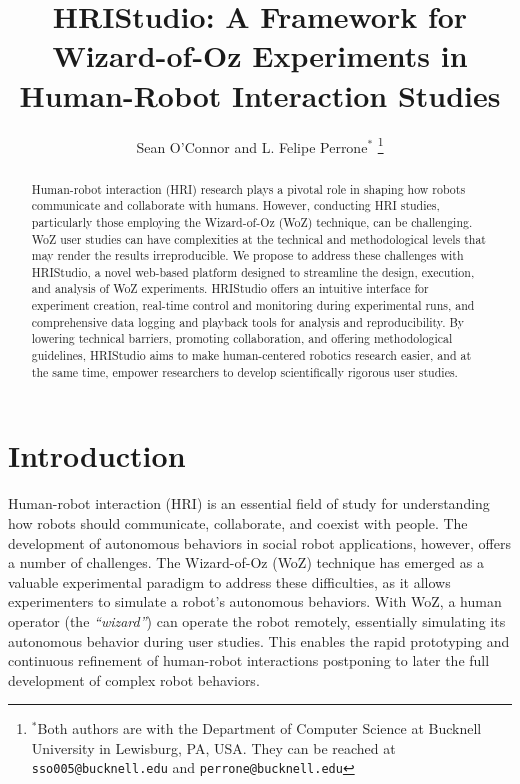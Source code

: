\documentclass[letterpaper, 10 pt, conference]{ieeeconf}
\title{\LARGE \bf HRIStudio: A Framework for Wizard-of-Oz Experiments in Human-Robot Interaction Studies}
\author{Sean O'Connor and L. Felipe Perrone$^{*}$
    \thanks{$^{*}$Both authors are with the Department of Computer Science at
        Bucknell University in Lewisburg, PA, USA. They can be reached at {\tt\small sso005@bucknell.edu} and {\tt\small perrone@bucknell.edu}}%
}
\begin{document}
\maketitle
\thispagestyle{empty}
\pagestyle{empty}


\begin{abstract}

Human-robot interaction (HRI) research plays a pivotal role in shaping how robots communicate and collaborate with humans. However, conducting HRI studies, particularly those employing the Wizard-of-Oz (WoZ) technique, can be challenging. WoZ user studies can have complexities at the technical and methodological levels that may render the results irreproducible. We propose to address these challenges with HRIStudio, a novel web-based platform designed to streamline the design, execution, and analysis of WoZ experiments. HRIStudio offers an intuitive interface for experiment creation, real-time control and monitoring during experimental runs, and comprehensive data logging and playback tools for analysis and reproducibility. By lowering technical barriers, promoting collaboration, and offering methodological guidelines, HRIStudio aims to make human-centered robotics research easier, and at the same time, empower researchers to develop scientifically rigorous user studies.

\end{abstract}




\section{Introduction}

Human-robot interaction (HRI) is an essential field of study for understanding how robots should communicate, collaborate, and coexist with people. The development of autonomous behaviors in social robot applications, however, offers a number of challenges. The Wizard-of-Oz (WoZ) technique has emerged as a valuable experimental paradigm to address these difficulties, as it allows experimenters to simulate a robot's autonomous behaviors. With WoZ, a human operator (the \emph{``wizard''}) can operate the robot remotely, essentially simulating its autonomous behavior during user studies. This enables the rapid prototyping and continuous refinement of human-robot interactions postponing to later the full development of complex robot behaviors.
\end{document}
